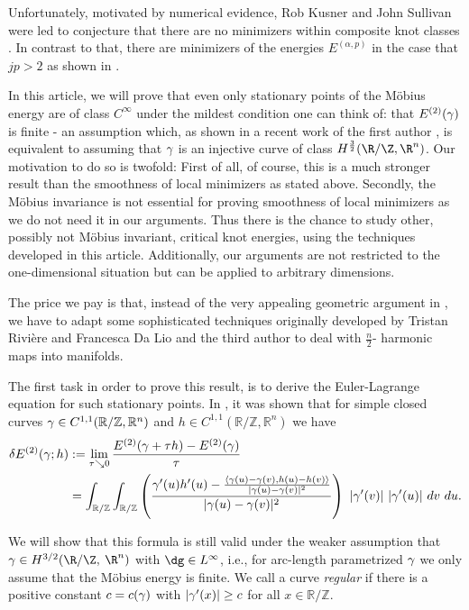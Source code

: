 Unfortunately, motivated by numerical evidence, Rob Kusner and John Sullivan were led to conjecture 
that there are no minimizers within composite knot classes \cite{Kusner1997}. In contrast to that, there
are minimizers of the energies $E^{(\alpha,p)}$ in the case that $jp>2$ as shown in \cite{OHara1994}. 

In this article, we will prove that even only stationary points of the M\"obius energy are of class
$C^\infty$ under the mildest condition one can think of: that $E^{(2)}({\gamma})$
is finite - an assumption which, as shown in a recent work of the first author \cite{Blatt2010a}, is equivalent to 
assuming that ${\gamma}$ is an injective curve of class $H^{\frac 3 2}(\R / \Z, \R ^n)$.
Our motivation to do so is twofold:
First of all, of course, 
this is a much stronger result than the smoothness of 
local minimizers as stated above.
Secondly, the M\"obius invariance is
not essential for proving smoothness of local minimizers as we do not need it in our arguments.
Thus there is the chance
to study other, possibly not M\"obius invariant, critical knot energies, using the techniques
developed in this article.
Additionally, our arguments are not restricted to the
one-dimensional situation but can be applied to arbitrary dimensions.
 
The price we pay is that, instead of the very appealing geometric argument in \cite{Freedman1994}, we have to adapt some 
sophisticated techniques originally developed  by Tristan Rivi\`ere and Francesca Da Lio \cite{DR11Sphere,DR11Man,DL11MannD}
and the third author \cite{SchikorranharmSphere,SchikorraIntBoundFrac11} to deal with $\frac n2$- harmonic maps into manifolds.

The first task in order to prove this result, is to derive the Euler-Lagrange equation for such stationary
points. In \cite{Freedman1994}, it was shown that for simple closed curves 
${\gamma} \in C^{1,1}(\mathbb R / \mathbb Z, \mathbb R^n)$ and $h\in C^{1,1}(\mathbb R / \mathbb Z, \mathbb R^n)$
we have
\begin{align*}
 \delta E ^{(2)}(\g;h) &:= \lim_{\tau \searrow 0 } \frac {E^{(2)}(\g+\tau h) - E^{(2)}(\g)}\tau \\
 &= \int_{\mathbb R / \mathbb Z} \int_{\mathbb R / \mathbb Z} 
  \left(\frac {\g'(u) h'(u) - \frac {\left\langle \g(u)- \g(v), h(u)-h(v) \right\rangle}
      {|\g(u)-\g(v)|^2}}{|\g(u)-\g(v)|^2 }\right)\ |\g'(v)|\ |\g'(u)|\ dv\ du.
\end{align*} 
 
We will show that this formula is still valid under the weaker assumption that 
$\g \in H^{3/2}(\R / \Z,$ $\R^\tdim)$ with $\dg\in L^{\infty}$, i.e., for
arc-length parametrized ${\gamma}$ we only assume that the M\"obius energy
is finite.
We call a curve \emph{regular}
if there is a positive constant $c=c({\gamma})$ with
$|{\gamma}'(x)| \geq c$ {for all } $x \in \mathbb R/ \mathbb Z$.


